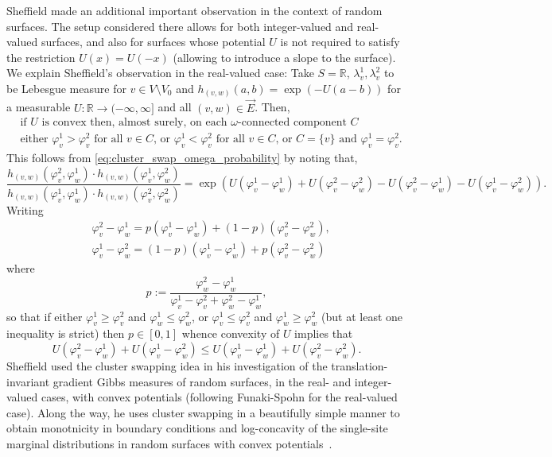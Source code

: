 \documentclass[english]{article}
\theoremstyle{plain}
\theoremstyle{plain}
\begin{document}
Sheffield \cite[Lemma 8.1.3]{sheffield2005random} made an additional
important observation in the context of random surfaces. The setup considered there allows for both integer-valued and real-valued surfaces, and also for surfaces whose potential $U$ is not required to satisfy the restriction $U(x)=U(-x)$ (allowing to introduce a slope to the surface). We explain Sheffield's observation in the real-valued case: Take $S = \mathbb{R}$, $\lambda^1_v, \lambda_v^2$ to be Lebesgue
measure for $v\in V\setminus V_0$ and $h_{(v,w)}(a,b) =
\exp(-U(a-b))$ for a measurable $U:\mathbb{R}\to(-\infty,\infty]$ and all $(v,w)\in \vec{E}$. Then,
\begin{equation*}
\begin{split}
  &\text{if $U$ is convex then, almost surely, on each $\omega$-connected component $C$}\\
  &\text{either $\varphi^1_v> \varphi^2_v$ for all $v\in C$, or $\varphi^1_v<
\varphi^2_v$ for all $v\in C$, or $C = \{v\}$ and $\varphi_v^1 = \varphi^2_v$.}
\end{split}
\end{equation*}
This follows from \eqref{eq:cluster_swap_omega_probability} by
noting that,
\begin{equation*}
  \frac{h_{(v,w)}(\varphi^2_v, \varphi^1_w)\cdot h_{(v,w)}(\varphi^1_v,\varphi^2_w)}{h_{(v,w)}(\varphi^1_v, \varphi^1_w)\cdot
  h_{(v,w)}(\varphi^2_v,\varphi^2_w)} = \exp(U(\varphi_v^1 -
  \varphi_w^1) + U(\varphi_v^2 - \varphi_w^2) - U(\varphi_v^2 -
  \varphi_w^1) - U(\varphi_v^1 - \varphi_w^2)).
\end{equation*}
Writing
\begin{align*}
  &\varphi_v^2 - \varphi_w^1 = p(\varphi_v^1 - \varphi_w^1) +
  (1-p)(\varphi_v^2 - \varphi_w^2),\\
  &\varphi_v^1 - \varphi_w^2 = (1-p)(\varphi_v^1 - \varphi_w^1) +
  p(\varphi_v^2 - \varphi_w^2)
\end{align*}
where
\begin{equation*}
  p:=\frac{\varphi_w^2 - \varphi_w^1}{\varphi_v^1 - \varphi_v^2 +
\varphi_w^2 - \varphi_w^1},
\end{equation*}
so that if either $\varphi_v^1 \ge \varphi_v^2$ and $\varphi_w^1 \le
\varphi_w^2$, or $\varphi_v^1 \le \varphi_v^2$ and $\varphi_w^1 \ge
\varphi_w^2$ (but at least one inequality is strict) then
$p\in[0,1]$ whence convexity of $U$ implies that
\begin{equation*}
  U(\varphi_v^2 - \varphi_w^1) + U(\varphi_v^1 - \varphi_w^2) \le U(\varphi_v^1 -
  \varphi_w^1) + U(\varphi_v^2 - \varphi_w^2).
\end{equation*}
Sheffield \cite{sheffield2005random} used the cluster swapping idea in his investigation of the
translation-invariant gradient Gibbs measures of random surfaces, in the real- and
integer-valued cases,
with convex potentials (following Funaki-Spohn \cite{funaki1997motion} for the
real-valued case). Along the way, he uses cluster swapping in a
beautifully simple manner to obtain monotnicity in boundary
conditions and log-concavity of the single-site marginal
distributions in random surfaces with convex potentials~\cite[Section 8.2]{sheffield2005random}.
\end{document}
